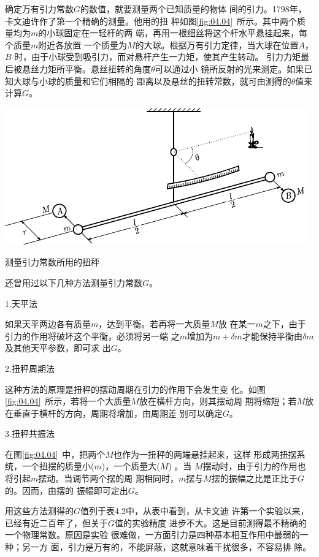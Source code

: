 确定万有引力常数$ G $的数值，就要测量两个已知质量的物体
间的引力。1798年，卡文迪许作了第一个精确的测量。他用的扭
秤如图\ref{fig:04.04}~所示。其中两个质量均为$ m $的小球固定在一轻杆的两
端，再用一根细丝将这个杆水平悬挂起来，每个质量$ m $附近各放置
一个质量为$ M $的大球。根据万有引力定律，当大球在位置$ A $，$ B $
时，由于小球受到吸引力，而对悬杆产生一力矩，使其产生转动。
引力力矩最后被悬丝力矩所平衡。悬丝扭转的角度$ \theta $可以通过小
镜所反射的光来测定。如果已知大球与小球的质量和它们相隔的
距离以及悬丝的扭转常数，就可由测得的$ \theta $值来计算$ G $。
\begin{figurex}
	\centering
	\includegraphics{figure/fig04.04}
	\caption{测量引力常数所用的扭秤}
	\label{fig:04.04}
\end{figurex}

还曾用过以下几种方法测量引力常数$ G $。

{\heiti 1.天平法}

如果天平两边各有质量$ m $，达到平衡。若再将一大质量$ M $放
在某一$ m $之下，由于引力的作用将破坏这个平衡，必须将另一端
之$ m $增加为$  m + \delta m $才能保持平衡由$ \delta m $及其他天平参数，即可求
出$ G $。

{\heiti 2.扭秤周期法}

这种方法的原理是扭秤的摆动周期在引力的作用下会发生变
化。如图\ref{fig:04.04}~所示，若将一个大质量$ M $放在横杆方向，则其摆动周
期将缩短；若$ M $放在垂直于横杆的方向，周期将增加，由周期差
别可以确定$ G $。

{\heiti 3.扭秤共振法}

在图\ref{fig:04.04}~中，把两个$ M $也作为一扭秤的两端悬挂起来，这样
形成两扭摆系统，一个扭摆的质量小($ m $)，一个质量大($ M $)  。当
$ M $摆动时，由于引力的作用也将引起$ m $摆动。当调节两个摆的周
期相同时，$ m $摆与$ M $摆的振幅之比是正比于$ G $的。因而，由摆的
振幅即可定出$ G $。

用这些方法测得的$ G $值列于表4.2中，从表中看到，从卡文迪
许第一个实验以来，已经有近二百年了，但关于$ G $值的实验精度
进步不大。这是目前测得最不精确的一个物理常数。原因是实验
很难做，一方面引力是四种基本相互作用中最弱的一种；另一方
面，引力是万有的，不能屏蔽，这就意味着干扰很多，不容易排
除。

